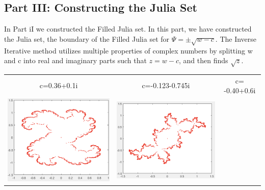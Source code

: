 \documentclass[11pt]{article}
\theoremstyle{plain}
\theoremstyle{definition}
\begin{document}
\subsection*{Part III: Constructing the Julia Set}
In Part iI we constructed the Filled Julia set. In this part, we have constructed the Julia set, the boundary of the Filled Julia set for $ \Psi = \pm \sqrt{w-c} $.  The Inverse Iterative method utilizes multiple properties of complex numbers by splitting w and c into real and imaginary parts such that $ z=w-c $, and then finds $ \sqrt{z} $.\\

\begin{tabular}{c c c}
c=0.36+0.1i                                   &c=-0.123-0.745i                         &c= -0.40+0.6i\\
\includegraphics*[scale = 0.25]{Plot10.png} 
& \includegraphics*[scale = 0.25]{Plot11.png} 

\end{tabular}
\end{document}
